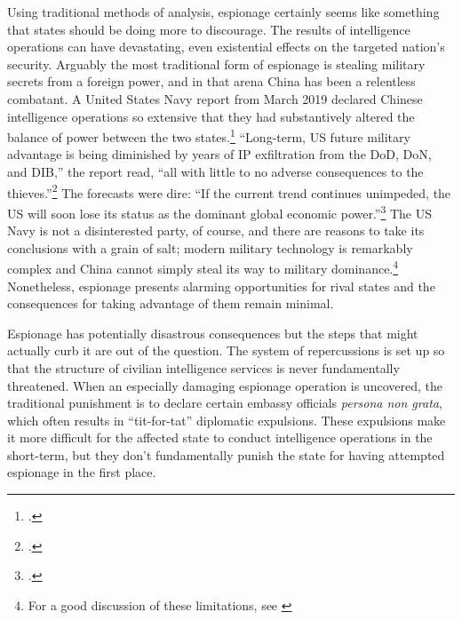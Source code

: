 \documentclass[14pt]{extarticle}
\begin{document}

Using traditional methods of analysis, espionage certainly seems like something that states should be doing more to discourage. The results of intelligence operations can have devastating, even existential effects on the targeted nation's security. Arguably the most traditional form of espionage is stealing military secrets from a foreign power, and in that arena China has been a relentless combatant. A United States Navy report from March 2019 declared Chinese intelligence operations so extensive that they had substantively altered the balance of power between the two states.\footcite{lubold_navy_2019} \enquote{Long-term, US future military advantage is being diminished by years of IP exfiltration from the DoD, DoN, and DIB,} the report read, \enquote{all with little to no adverse consequences to the thieves.}\footcite[p.~6]{bayer_cybersecurity_2019} The forecasts were dire: \enquote{If the current trend continues unimpeded, the US will soon lose its status as the dominant global economic power.}\footcite[p.~5]{bayer_cybersecurity_2019} The US Navy is not a disinterested party, of course, and there are reasons to take its conclusions with a grain of salt; modern military technology is remarkably complex and China cannot simply steal its way to military dominance.\footnote{For a good discussion of these limitations, see \cite{gilli_why_2019}} Nonetheless, espionage presents alarming opportunities for rival states and the consequences for taking advantage of them remain minimal.

Espionage has potentially disastrous consequences but the steps that might actually curb it are out of the question. The system of repercussions is set up so that the structure of civilian intelligence services is never fundamentally threatened. When an especially damaging espionage operation is uncovered, the traditional punishment is to declare certain embassy officials \emph{persona non grata}, which often results in \enquote{tit-for-tat} diplomatic expulsions. These expulsions make it more difficult for the affected state to conduct intelligence operations in the short-term, but they don't fundamentally punish the state for having attempted espionage in the first place.
\end{document}
